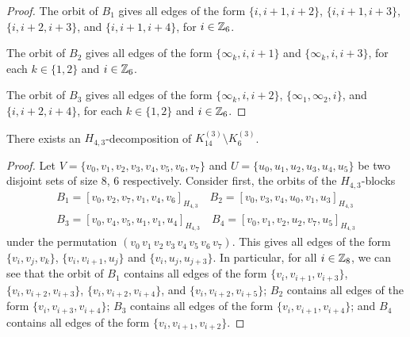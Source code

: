 \begin{subappendices}
\begin{proof}
The orbit of $B_1$ gives all edges of the form $\{i, i+1, i+2\}$, $\{i, i+1, i+3\}$, $\{i, i+2, i+3\}$, and $\{i, i+1, i+4\}$, for $i \in \mathbb{Z}_6$.

The orbit of $B_2$ gives all edges of the form $\{\infty_k, i, i+1\}$ and $\{\infty_k, i, i+3\}$, for each $k \in \{1, 2\}$ and $i \in \mathbb{Z}_6$.

The orbit of $B_3$ gives all edges of the form $\{\infty_k, i, i+2\}$, $\{\infty_1, \infty_2, i\}$, and $\{i, i+2, i+4\}$, for each $k \in \{1, 2\}$ and $i \in \mathbb{Z}_6$.
\end{proof}


\begin{example} \label{eg:H_43-k14-k6}
There exists an $H_{4,3}$-decomposition of $K_{14}^{(3)} \setminus K_{6}^{(3)}$.
\end{example}

\begin{proof}
Let $V = \{v_0, v_1, v_2, v_3, v_4, v_5, v_6, v_7\}$ and $U = \{u_0, u_1, u_2,
u_3, u_4, u_5\}$ be two disjoint sets of size 8, 6 respectively. Consider first, the orbits of the $H_{4,3}$-blocks
\begin{align*}
    B_1 = [v_0, v_2, v_7, v_1, v_4, v_6]_{H_{4,3}} \quad
    B_2 = [v_0, v_3, v_4, u_0, v_1, u_3]_{H_{4,3}} \\
    B_3 = [v_0, v_4, v_5, u_1, v_1, u_4]_{H_{4,3}} \quad
    B_4 = [v_0, v_1, v_2, u_2, v_7, u_5]_{H_{4,3}}
\end{align*}
under the permutation $(v_0 \, v_1 \, v_2 \, v_3 \, v_4 \, v_5 \, v_6 \, v_7)$.
This gives all edges of the form $\{v_i, v_j, v_k\}$, $\{v_i, v_{i+1}, u_j\}$ and $\{v_i, u_j, u_{j+3}\}$.
In particular, for all $i \in \mathbb{Z}_8$,
we can see that the orbit of $B_1$ contains all edges of the form $\{v_i, v_{i+1}, v_{i+3}\}$, $\{v_i, v_{i+2}, v_{i+3}\}$, $\{v_i, v_{i+2}, v_{i+4}\}$, and $\{v_i, v_{i+2}, v_{i+5}\}$;
$B_2$ contains all edges of the form $\{v_i, v_{i+3}, v_{i+4}\}$; $B_3$ contains all edges of the form $\{v_i, v_{i+1}, v_{i+4}\}$; and $B_4$ contains all edges of the form $\{v_i, v_{i+1}, v_{i+2}\}$.


\end{proof}
\end{subappendices}
